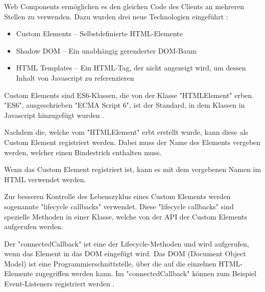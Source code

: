 
Web Components ermöglichen es den gleichen Code des Clients an mehreren Stellen zu verwenden. 
Dazu wurden drei neue Technologien eingeführt \cite{MDNWebComponents}:

\begin{itemize}
    \item Custom Elements -- Selbstdefinierte HTML-Elemente
    \item Shadow DOM -- Ein unabhängig gerenderter DOM-Baum
    \item HTML Templates -- Ein HTML-Tag, der nicht angezeigt wird, um dessen Inhalt von Javascript zu referenzieren
\end{itemize}



Custom Elements sind ES6-Klassen, die von der Klasse "{\ttfamily HTMLElement}" erben. 
"ES6", ausgeschrieben "ECMA Script 6", ist der Standard, in dem Klassen in Javascript hinzugefügt wurden \cite{MDNes6Classes}.


Nachdem die, welche vom "{\ttfamily HTMLElement}" erbt erstellt wurde, kann diese als Custom Element registriert werden. 
Dabei muss der Name des Elements vergeben werden, welcher einen Bindestrich enthalten muss.


Wenn das Custom Element registriert ist, kann es mit dem vergebenen Namen im HTML verwendet werden.


Zur besseren Kontrolle des Lebenszyklus eines Custom Elements werden sogenannte "lifecycle callbacks" verwendet.
Diese "lifecycle callbacks" sind spezielle Methoden in einer Klasse, welche von der API der Custom Elements aufgerufen werden. \cite{MDNWebCustomElements}


Der "{\ttfamily connectedCallback}" ist eine der Lifecycle-Methoden und wird aufgerufen, wenn das Element in das DOM eingefügt wird. 
Das DOM (Document Object Model) ist eine Programmierschnittstelle, über die auf die einzelnen HTML-Elemente zugegriffen werden kann. \cite{MDNDOM} Im "{\ttfamily connectedCallback}" können zum Beispiel Event-Listeners registriert werden \cite{MDNWebCustomElements}.

